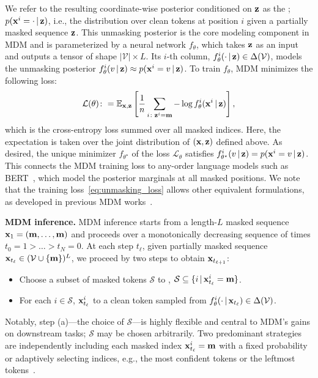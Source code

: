 We refer to the resulting coordinate-wise posterior conditioned on ${\mathbf{z}}$ as the ; $p({\mathbf{x}}^i=\cdot\,|\,{\mathbf{z}})$, i.e., the distribution over clean tokens at position $i$ given a partially masked sequence ${\mathbf{z}}$. This unmasking posterior is the core modeling component in MDM and is parameterized by a neural network $f_\theta$, which takes ${\mathbf{z}}$ as an input and outputs a tensor of shape $|\mathcal{V}|\times L$. Its $i$-th column, $f_\theta^i(\cdot\,|\,{\mathbf{z}})\in\Delta(\mathcal{V})$, models the unmasking posterior $f_\theta^i(v\,|\,{\mathbf{z}}) \approx p({\mathbf{x}}^i=v\,|\,{\mathbf{z}})$. To train $f_\theta$, MDM minimizes the following loss:
\begin{equation} \label{eq:unmasking_loss}
    \mathcal{L}(\theta)\colon =  \mathbb{E}_{{\mathbf{x}},{\mathbf{z}}}\left[\frac{1}{n}\sum_{i\colon {\mathbf{z}}^i=\mathbf{m}} -\log f_\theta^i({\mathbf{x}}^i \,|\,{\mathbf{z}}) \right],
\end{equation}
which is the cross-entropy loss summed over all masked indices. Here, the expectation is taken over the joint distribution of $({\mathbf{x}},{\mathbf{z}})$ defined above. As desired, the unique minimizer $f_{\theta^\star}$ of the loss $\mathcal{L}_\theta$ satisfies $f_{\theta^\star}^i(v\,|\,{\mathbf{z}})= p({\mathbf{x}}^i=v\,|\, {\mathbf{z}})$. This connects the MDM training loss to any-order language models such as BERT~\citep{devlin2019bert}, which model the posterior marginals at all masked positions. We note that the training loss~\eqref{eq:unmasking_loss} allows other equivalent formulations, as developed in previous MDM works~\citep{nie2025large,sahoo2024simple,shi2024simplified}.

\textbf{MDM inference.} MDM inference starts from a length-$L$ masked sequence ${\mathbf{x}}_1 = (\mathbf{m},\dots,\mathbf{m})$ and proceeds over a monotonically decreasing sequence of times $t_0=1>\dots>t_N = 0$. At each step $t_\ell$, given partially masked sequence ${\mathbf{x}}_{t_\ell}\in(\mathcal{V}\cup \{\mathbf{m}\})^L$, we proceed by two steps to obtain ${\mathbf{x}}_{t_{\ell+1}}$:
\begin{itemize}[leftmargin=17pt,itemsep=0pt,topsep=-0.25em]
\item[(a)] Choose a subset of masked tokens $\mathcal{S}$ to , $\mathcal{S}\subseteq\{i\,|\,{\mathbf{x}}_{t_\ell}^i=\mathbf{m}\}$.
\item[(b)] For each $i \in \mathcal{S}$,  ${\mathbf{x}}_{t_\ell}^i$ to a clean token sampled from $f_\theta^i(\cdot\,|\, {\mathbf{x}}_{t_\ell})\in\Delta(\mathcal{V})$.
\end{itemize}
Notably, step (a)—the choice of $\mathcal{S}$—is highly flexible and central to MDM’s gains on downstream tasks; $\mathcal{S}$ may be chosen arbitrarily. Two predominant strategies are independently including each masked index ${\mathbf{x}}_{t_\ell}^i=\mathbf{m}$ with a fixed probability~\citep{sahoo2024simple, shi2024simplified} or adaptively selecting indices, e.g., the most confident tokens or the leftmost tokens~\citep{chang2022maskgit,zheng2023reparameterized,kim2025train,nie2025large}.

